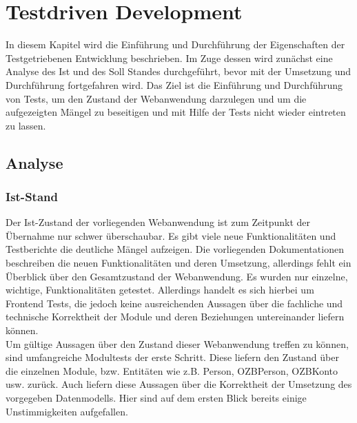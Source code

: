 \documentclass[12pt,             %
               a4paper,          %
               listof=totoc,     %
               index=totoc,      %
               bibliography=totoc,%
               oneside,         %
               BCOR1cm,          %
               english   %
               ]{scrbook}
\begin{document}
\clearpage
\chapter{Testdriven Development}
In diesem Kapitel wird die Einführung und Durchführung der Eigenschaften der Testgetriebenen Entwicklung beschrieben. Im Zuge dessen wird zunächst eine Analyse des Ist und des Soll Standes durchgeführt, bevor mit der Umsetzung und Durchführung fortgefahren wird. Das Ziel ist die Einführung und Durchführung von Tests, um den Zustand der Webanwendung darzulegen und um die aufgezeigten Mängel zu beseitigen und mit Hilfe der Tests nicht wieder eintreten zu lassen.    

\section{Analyse}
\subsection{Ist-Stand}
Der Ist-Zustand der vorliegenden Webanwendung ist zum Zeitpunkt der Übernahme nur schwer überschaubar. Es gibt viele neue Funktionalitäten und Testberichte die deutliche Mängel aufzeigen. Die vorliegenden Dokumentationen beschreiben die neuen Funktionalitäten und deren Umsetzung, allerdings fehlt ein Überblick über den Gesamtzustand der Webanwendung. Es wurden nur einzelne, wichtige, Funktionalitäten getestet. Allerdings handelt es sich hierbei um Frontend Tests, die jedoch keine ausreichenden Aussagen über die fachliche und technische Korrektheit der Module und deren Beziehungen untereinander liefern können.\\

Um gültige Aussagen über den Zustand dieser Webanwendung treffen zu können, sind umfangreiche Modultests der erste Schritt. Diese liefern den Zustand über die einzelnen Module, bzw. Entitäten wie z.B. Person, OZBPerson, OZBKonto usw. zurück. Auch liefern diese Aussagen über die Korrektheit der Umsetzung des vorgegeben Datenmodells. Hier sind auf dem ersten Blick bereits einige Unstimmigkeiten aufgefallen.\\

\end{document}
